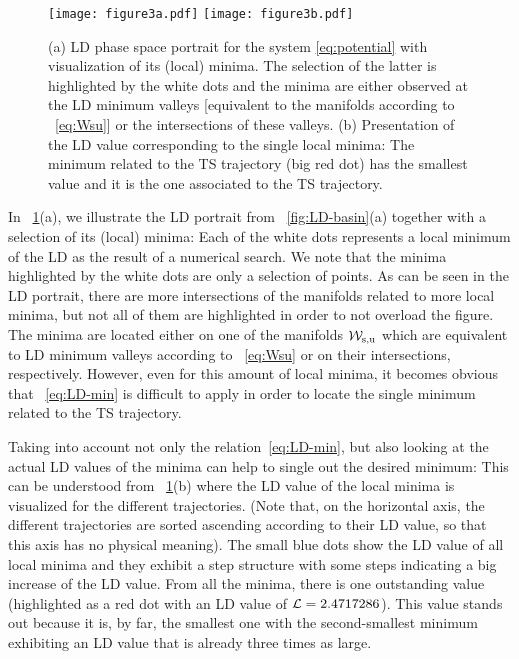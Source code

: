 \documentclass[aip,reprint,jcp,amsmath,amssymb,superscriptaddress,floatfix]{revtex4-1}
\begin{document}
\begin{figure}[t]
\centering
\texttt{[image: figure3a.pdf]}
\texttt{[image: figure3b.pdf]}
\caption{%
(a)
LD phase space portrait for the system \eqref{eq:potential} with visualization 
of its (local) minima.
The selection of the latter is highlighted by the white dots and the minima are 
either observed at the LD minimum valleys [equivalent to the manifolds 
according to \EQ~\eqref{eq:Wsu}] or the intersections of these valleys.
% 
(b)
Presentation of the LD value corresponding to the single local minima:
The minimum related to the TS trajectory (big red dot) has the smallest value 
and it is the one associated to the TS trajectory. 
}
\label{fig:minima}
\end{figure}

In \FIG~\ref{fig:minima}(a), we illustrate the LD portrait from 
\FIG~\ref{fig:LD-basin}(a) together with a selection of its (local) minima: 
Each of the white dots represents a local minimum of the LD as the result of 
a numerical search.
We note that the minima highlighted by the white dots are only a selection of
points.
As can be seen in the LD portrait, there are more intersections of the 
manifolds related to more local minima, but not all of them are highlighted in 
order to not overload the figure.
The minima are located either on one of the manifolds $\mathcal{W}_\text{s,u}$ which are 
equivalent to LD minimum valleys according to \EQ~\eqref{eq:Wsu} or on their 
intersections, respectively.
% 
However, even for this amount of local minima, it becomes obvious that 
\EQ~\eqref{eq:LD-min} is difficult to apply in order to locate the single 
minimum related to the TS trajectory.


Taking into account not only the relation~\eqref{eq:LD-min}, but also looking 
at the actual LD values of the minima can help to single out the desired 
minimum:
This can be understood from \FIG~\ref{fig:minima}(b) where the LD value of the 
local minima is visualized for the different trajectories.
(Note that, on the horizontal axis, the different trajectories are sorted 
ascending according to their LD value, so that this axis has no physical 
meaning).
The small blue dots show the LD value of all local minima and they exhibit a 
step structure with some steps indicating a big increase of the LD value.
From all the minima, there is one outstanding value (highlighted as a red dot 
with an LD value of $\mathcal{L}=2.4717286$).
This value stands out because it is, by far, the smallest one with the 
second-smallest minimum exhibiting an LD value that is already three times as 
large.
\end{document}
